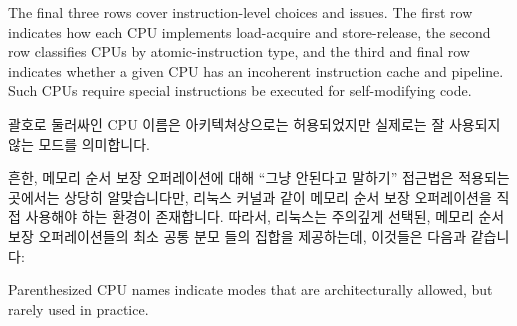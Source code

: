 The final three rows cover instruction-level choices and issues.
The first row indicates how each CPU implements load-acquire
and store-release, the second row classifies CPUs by atomic-instruction
type, and the third and final row
indicates whether a given CPU has an incoherent
instruction cache and pipeline.
Such CPUs require special instructions be executed for self-modifying
code.
\fi

괄호로 둘러싸인 CPU 이름은 아키텍쳐상으로는 허용되었지만 실제로는 잘 사용되지
않는 모드를 의미합니다.

흔한, 메모리 순서 보장 오퍼레이션에 대해 ``그냥 안된다고 말하기'' 접근법은
적용되는 곳에서는 상당히 알맞습니다만, 리눅스 커널과 같이 메모리 순서 보장
오퍼레이션을 직접 사용해야 하는 환경이 존재합니다.
따라서, 리눅스는 주의깊게 선택된, 메모리 순서 보장 오퍼레이션들의 최소 공통
분모 들의 집합을 제공하는데, 이것들은 다음과 같습니다:
\iffalse

Parenthesized CPU names indicate modes that are architecturally allowed,
but rarely used in practice.

